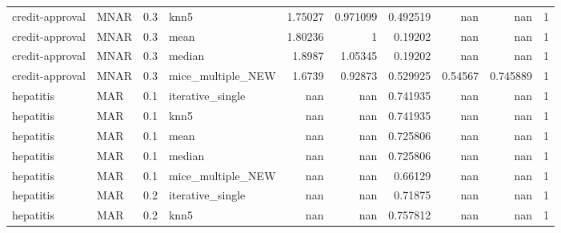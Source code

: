 \begin{table}[ht]
\begin{tabular}{llrlrrrrrr}
 credit-approval & MNAR        &         0.3 & knn5              &       1.75027  &             0.971099 &              0.492519  &                       nan        &                    nan         &         1 \\
 credit-approval & MNAR        &         0.3 & mean              &       1.80236  &             1        &              0.19202   &                       nan        &                    nan         &         1 \\
 credit-approval & MNAR        &         0.3 & median            &       1.8987   &             1.05345  &              0.19202   &                       nan        &                    nan         &         1 \\
 credit-approval & MNAR        &         0.3 & mice\_multiple\_NEW &       1.6739   &             0.92873  &              0.529925  &                         0.54567  &                      0.745889  &         1 \\
 hepatitis       & MAR         &         0.1 & iterative\_single  &     nan        &           nan        &              0.741935  &                       nan        &                    nan         &         1 \\
 hepatitis       & MAR         &         0.1 & knn5              &     nan        &           nan        &              0.741935  &                       nan        &                    nan         &         1 \\
 hepatitis       & MAR         &         0.1 & mean              &     nan        &           nan        &              0.725806  &                       nan        &                    nan         &         1 \\
 hepatitis       & MAR         &         0.1 & median            &     nan        &           nan        &              0.725806  &                       nan        &                    nan         &         1 \\
 hepatitis       & MAR         &         0.1 & mice\_multiple\_NEW &     nan        &           nan        &              0.66129   &                       nan        &                    nan         &         1 \\
 hepatitis       & MAR         &         0.2 & iterative\_single  &     nan        &           nan        &              0.71875   &                       nan        &                    nan         &         1 \\
 hepatitis       & MAR         &         0.2 & knn5              &     nan        &           nan        &              0.757812  &                       nan        &                    nan         &         1 \\

\end{tabular}
\end{table}
